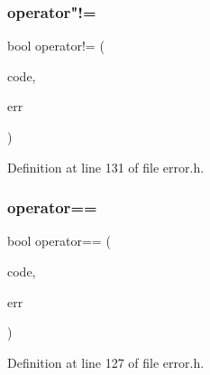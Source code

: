 \subsubsection{\texorpdfstring{operator"!=}{operator!=}}
{\footnotesize\ttfamily bool operator!= (\begin{DoxyParamCaption}\item[{\mbox{\hyperlink{group___r_a_p_i_d_j_s_o_n___e_r_r_o_r_s_ga7d3acf640886b1f2552dc8c4cd6dea60}{Parse\+Error\+Code}}}]{code,  }\item[{const \mbox{\hyperlink{structrapidjson_1_1_parse_result}{Parse\+Result}} \&}]{err }\end{DoxyParamCaption})\hspace{0.3cm}{\ttfamily [friend]}}



Definition at line 131 of file error.\+h.


\begin{DoxyCode}{0}

\end{DoxyCode}
\mbox{\label{structrapidjson_1_1_parse_result_a58c9982e833d1c74686506ac7449200c}} 
\subsubsection{\texorpdfstring{operator==}{operator==}}
{\footnotesize\ttfamily bool operator== (\begin{DoxyParamCaption}\item[{\mbox{\hyperlink{group___r_a_p_i_d_j_s_o_n___e_r_r_o_r_s_ga7d3acf640886b1f2552dc8c4cd6dea60}{Parse\+Error\+Code}}}]{code,  }\item[{const \mbox{\hyperlink{structrapidjson_1_1_parse_result}{Parse\+Result}} \&}]{err }\end{DoxyParamCaption})\hspace{0.3cm}{\ttfamily [friend]}}



Definition at line 127 of file error.\+h.


\begin{DoxyCode}{0}

\end{DoxyCode}


